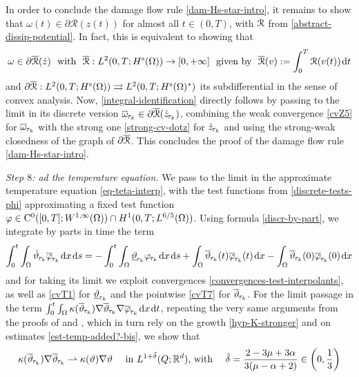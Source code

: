 \documentclass[a4paper,10pt,reqno]{amsart}
\numberwithin{equation}{section}
\newcommand{\R}{\mathbb{R}}
\numberwithin{equation}{section}
\newcommand{\weakto}{\rightharpoonup} %
\def\dd{\;\!\mathrm{d}} %
\newcommand{\teta}{\vartheta}
\newcommand{\piecewiseConstant}[2]{\overline{#1}_{\kern-1pt#2}}
\newcommand{\pwc}{\piecewiseConstant}
\newcommand{\upiecewiseConstant}[2]{\underline{#1}_{\kern-1pt#2}}
\newcommand{\upwc}{\upiecewiseConstant}
\newcommand{\piecewiseLinear}[2]{{#1}_{\kern-1pt#2}}
\newcommand{\pwl}{\piecewiseLinear}
\newcommand{\condu}{\kappa}
\newcommand{\Did}[1]{\mathcal{R}(#1)}
\newcommand{\subd}{\partial}
\newcommand{\spz}{H^{\mathrm{s}}(\Omega)}
\newcommand{\EEE}{\color{black}}
\newcommand{\MMM}{\color{black}}%
\begin{document}
 In order to conclude the damage flow rule \eqref{dam-Hs-star-intro}, it remains to show
  that $\omega(t) \in \subd \Did{z(t)} $ for almost all $t\in (0,T)$, with ${\mathcal R}$ from \eqref{abstract-dissip-potential}.
  In fact, this is equivalent to showing that 
 \begin{equation}
 \label{integral-identification}
 \omega \in \subd \overline{\calR}(\dot{z}) \ 
   \text{ with }  \  \overline{\calR}:
  L^2(0,T; \spz) \to [0,+\infty]  \ \text{ given by } \ 
 \overline{\calR}(v): =\int_0^T \Did{v(t)} \dd t
 \end{equation}
and $\subd \overline{\calR}:    L^2(0,T; \spz) \rightrightarrows   L^2(0,T; \spz^*)$ its subdifferential 
in the sense of convex analysis. Now, \eqref{integral-identification} directly  follows by 
passing to the limit in
its discrete version $\pwc\omega{\tau_k} \in \subd \overline{\calR}(\pwl{\dot{z}}{\tau_k})$, 
combining the 
weak convergence
\eqref{cvZ5} for $\pwc \omega{\tau_k}$
with the strong one 
\eqref{strong-cv-dotz} for $\pwl{\dot z}{\tau_k}$ and using
 the strong-weak closedness of the graph of $\partial\overline{{\mathcal R}}$. 
This concludes the proof of the damage flow rule \eqref{dam-Hs-star-intro}. 
 \par
\noindent
\emph{Step $8$: ad the temperature equation.}
  We  pass to the limit in the approximate temperature equation \eqref{eq-teta-interp}, 
with the test functions from \eqref{discrete-tests-phi}
approximating  a fixed test function $
\varphi\in {\mathrm C}^0([0,T]; W^{1,\infty}(\Omega))\cap
H^1(0,T;L^{6/5}(\Omega))  $. 
Using formula \eqref{discr-by-part},  we integrate by parts in time   the term 
 \[
 \int_0^t \int_\Omega  \pwl{\dot \teta}{\tau_k} \pwc{\varphi}{\tau_k}\dd x \dd s
 = - \int_0^t \int_\Omega \upwc{\teta}{\tau_k} \pwl{\varphi}{\tau_k}\dd x \dd s 
 + \int_\Omega \pwc{\teta}{\tau_k}(t) \pwc{\varphi}{\tau_k}(t)\dd x - 
  \int_\Omega \pwc{\teta}{\tau_k}(0) \pwc{\varphi}{\tau_k}(0)\dd x
  \]
and for taking its limit  we exploit convergences \eqref{convergences-test-interpolants},  as 
well as  \eqref{cvT1} for $\upwc \teta{\tau_k}$   and  the pointwise  \eqref{cvT7} for $\pwc \teta{\tau_k}$. 
  For the limit passage in the term
   $\int_0^t \int_\Omega \condu(\pwc \teta{\tau_k}) \nabla
     \pwc \teta{\tau_k} \nabla \pwc \varphi{\tau_k} \dd x \dd t$, repeating the very same arguments 
     from the proofs of \cite[Thm.\ 2]{Rocca-Rossi} and \cite[Thm.\ 2]{Rossi2016}, \MMM which  in turn rely on the growth \eqref{hyp-K-stronger}
     and on estimates \eqref{est-temp-added?-bis}, \EEE
      we show that  
    \begin{equation}
    \label{specific-tilde-delta}
    \condu(\pwc \teta{\tau_k}) \nabla  \pwc \teta{\tau_k} 
    \weakto \condu(\teta) \nabla \teta \quad \text{ in $L^{1+\tilde\delta}(Q;\R^d)$, with } \quad
    \tilde{\delta} = \frac{2-3\mu+3\alpha}{3(\mu-\alpha+2)} \in \left(0,\frac13 \right)
    \end{equation}
\end{document}
